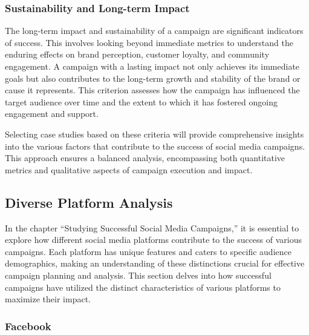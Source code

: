 \documentclass[
]{book}
\begin{document}
\hypertarget{sustainability-and-long-term-impact}{%
\subsubsection*{Sustainability and Long-term Impact}\label{sustainability-and-long-term-impact}}

The long-term impact and sustainability of a campaign are significant indicators of success. This involves looking beyond immediate metrics to understand the enduring effects on brand perception, customer loyalty, and community engagement. A campaign with a lasting impact not only achieves its immediate goals but also contributes to the long-term growth and stability of the brand or cause it represents. This criterion assesses how the campaign has influenced the target audience over time and the extent to which it has fostered ongoing engagement and support.

Selecting case studies based on these criteria will provide comprehensive insights into the various factors that contribute to the success of social media campaigns. This approach ensures a balanced analysis, encompassing both quantitative metrics and qualitative aspects of campaign execution and impact.

\hypertarget{diverse-platform-analysis}{%
\subsection*{Diverse Platform Analysis}\label{diverse-platform-analysis}}

In the chapter ``Studying Successful Social Media Campaigns,'' it is essential to explore how different social media platforms contribute to the success of various campaigns. Each platform has unique features and caters to specific audience demographics, making an understanding of these distinctions crucial for effective campaign planning and analysis. This section delves into how successful campaigns have utilized the distinct characteristics of various platforms to maximize their impact.

\hypertarget{facebook}{%
\subsubsection*{Facebook}\label{facebook}}
\end{document}
